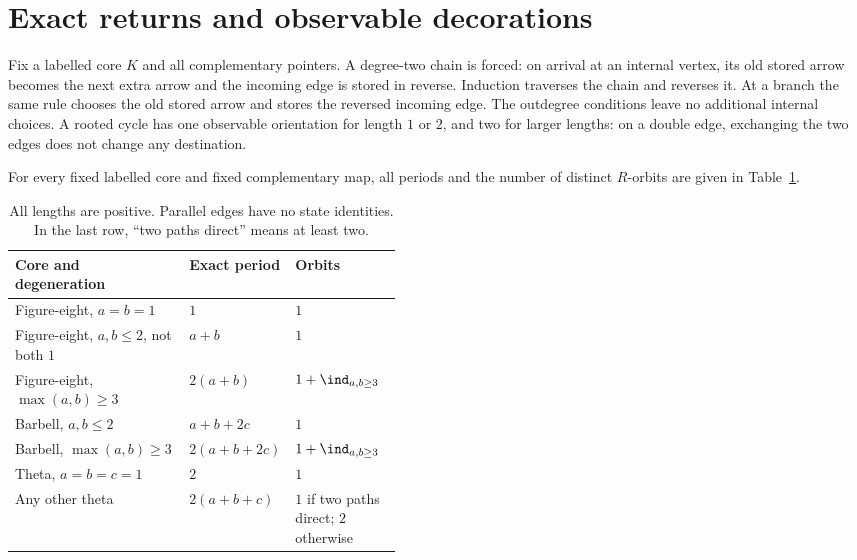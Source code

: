 \section{Exact returns and observable decorations}
Fix a labelled core $K$ and all complementary pointers. A degree-two chain
is forced: on arrival at an internal vertex, its old stored arrow becomes
the next extra arrow and the incoming edge is stored in reverse. Induction
traverses the chain and reverses it. At a branch the same rule chooses the
old stored arrow and stores the reversed incoming edge. The outdegree
conditions leave no additional internal choices. A rooted cycle has one
observable orientation for length $1$ or $2$, and two for larger lengths:
on a double edge, exchanging the two edges does not change any destination.

\begin{theorem}\label{thm:table}
For every fixed labelled core and fixed complementary map, all periods and
the number of distinct $R$-orbits are given in Table~\ref{tab:periods}.
\end{theorem}
\begin{table}[t]
\centering\small
\begin{tabular}{@{}p{0.45\linewidth}ll@{}}
\toprule
Core and degeneration & Exact period & Orbits\\
\midrule
Figure-eight, $a=b=1$ & $1$ & $1$\\
Figure-eight, $a,b\le2$, not both $1$ & $a+b$ & $1$\\
Figure-eight, $\max(a,b)\ge3$ & $2(a+b)$ & $1+\ind_{a,b\ge3}$\\
Barbell, $a,b\le2$ & $a+b+2c$ & $1$\\
Barbell, $\max(a,b)\ge3$ & $2(a+b+2c)$ & $1+\ind_{a,b\ge3}$\\
Theta, $a=b=c=1$ & $2$ & $1$\\
Any other theta & $2(a+b+c)$ & $1$ if two paths direct; $2$ otherwise\\
\bottomrule
\end{tabular}
\caption{All lengths are positive. Parallel edges have no state identities.
In the last row, ``two paths direct'' means at least two.}
\label{tab:periods}
\end{table}

